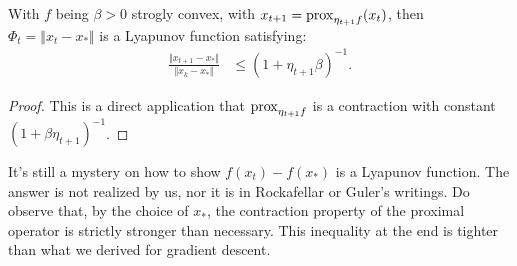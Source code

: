 \documentclass[12pt]{article}
\begin{document}
        \begin{theorem}\label{ppm_lyapunov_scvx}
            With $f$ being $\beta > 0$ strogly convex, with $x_{t + 1} = \operatorname{prox}_{\eta_{t + 1}f}(x_t)$, then $\Phi_t = \Vert x_{t} - x_*\Vert$ is a Lyapunov function satisfying: 
            \begin{align*}
                \frac{\Vert x_{t + 1} - x_*\Vert}{
                    \Vert x_k - x_*\Vert
                } &\le (1 + \eta_{t + 1}\beta)^{-1}. 
            \end{align*}
        \end{theorem}
        \begin{proof}
            This is a direct application that $\operatorname{prox}_{\eta_{t + 1}f}$ is a contraction with constant $(1 + \beta\eta_{t +1})^{-1}$. 
        \end{proof}
        \begin{remark}
            It's still a mystery on how to show $f(x_t) - f(x_*)$ is a Lyapunov function. 
            The answer is not realized by us, nor it is in Rockafellar \cite{rockafellar_monotone_1976} or Guler's\cite{guler_convergence_1991} writings. 
            Do observe that, by the choice of $x_*$, the contraction property of the proximal operator is strictly stronger than necessary. 
            This inequality at the end is tighter than what we derived for gradient descent. 
        \end{remark}
        
\end{document}
